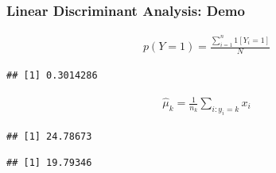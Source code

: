 \documentclass[
  shownotes,
  xcolor={svgnames},
  hyperref={colorlinks,citecolor=DarkBlue,linkcolor=DarkRed,urlcolor=DarkBlue}
  , aspectratio=169]{beamer}
\newenvironment{Shaded}{\begin{snugshade}}{\end{snugshade}}
\newcommand{\DecValTok}[1]{\textcolor[rgb]{0.00,0.00,0.81}{#1}}
\newcommand{\KeywordTok}[1]{\textcolor[rgb]{0.13,0.29,0.53}{\textbf{#1}}}
\newcommand{\NormalTok}[1]{#1}
\newcommand{\OperatorTok}[1]{\textcolor[rgb]{0.81,0.36,0.00}{\textbf{#1}}}
\begin{document}
\begin{frame}[fragile]
\frametitle{Linear Discriminant Analysis: Demo}
\begin{scriptsize}
\begin{align}
    p(Y=1) = \frac{\sum_{i=1}^n 1[Y_i=1]}{N}
  \end{align}


\begin{Shaded}
\end{Shaded}
\begin{verbatim}
## [1] 0.3014286
\end{verbatim}
\end{scriptsize}
\begin{scriptsize}
\begin{align}
\hat{\mu}_k=\frac{1}{n_k}\sum_{i:y_i=k}x_i
\end{align}


\begin{Shaded}
\end{Shaded}

\begin{verbatim}
## [1] 24.78673
\end{verbatim}

\begin{Shaded}
\end{Shaded}

\begin{verbatim}
## [1] 19.79346
\end{verbatim}
\end{scriptsize}

\end{frame}
\end{document}
